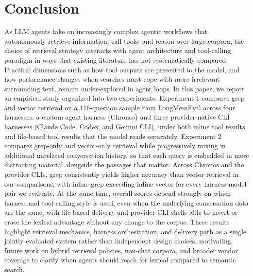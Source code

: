 \documentclass[sigconf,nonacm]{acmart}
\begin{document}
\section{Conclusion}
\label{sec:conclusion}
As LLM agents take on increasingly complex agentic workflows that autonomously retrieve information, call tools, and reason over large corpora, the choice of retrieval strategy interacts with agent architecture and tool-calling paradigm in ways that existing literature has not systematically compared. Practical dimensions such as how tool outputs are presented to the model, and how performance changes when searches must cope with more irrelevant surrounding text, remain under-explored in agent loops. In this paper, we report an empirical study organized into two experiments. Experiment 1 compares grep and vector retrieval on a 116-question sample from LongMemEval across four harnesses: a custom agent harness (Chronos) and three provider-native CLI harnesses (Claude Code, Codex, and Gemini CLI), under both inline tool results and file-based tool results that the model reads separately. Experiment 2 compares grep-only and vector-only retrieval while progressively mixing in additional unrelated conversation history, so that each query is embedded in more distracting material alongside the passages that matter. Across Chronos and the provider CLIs, grep consistently yields higher accuracy than vector retrieval in our comparisons, with inline grep exceeding inline vector for every harness-model pair we evaluate. At the same time, overall scores depend strongly on which harness and tool-calling style is used, even when the underlying conversation data are the same, with file-based delivery and provider CLI shells able to invert or erase the lexical advantage without any change to the corpus. These results highlight retrieval mechanics, harness orchestration, and delivery path as a single jointly evaluated system rather than independent design choices, motivating future work on hybrid retrieval policies, non-chat corpora, and broader vendor coverage to clarify when agents should reach for lexical compared to semantic search.








\end{document}
